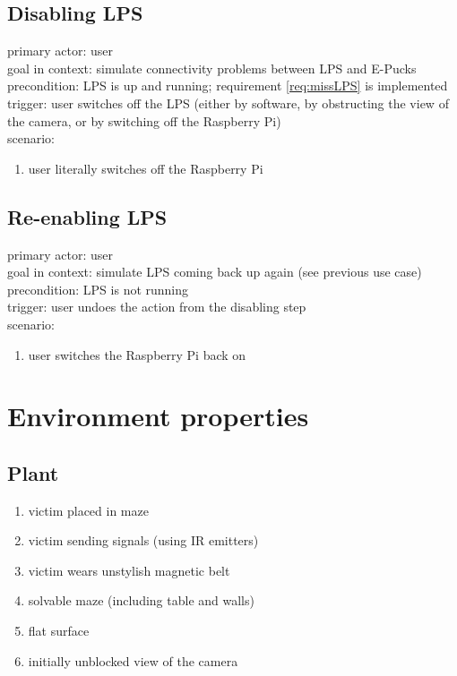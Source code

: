 \documentclass[a4paper,parskip,headheight=38pt]{scrartcl} %
\begin{document}
\subsection{Disabling LPS}
primary actor: user \\
goal in context: simulate connectivity problems between LPS and E-Pucks \\
precondition: LPS is up and running; requirement \ref{req:missLPS} is implemented \\
trigger: user switches off the LPS (either by software, by obstructing the view of the camera, or by switching off the Raspberry Pi) \\
scenario:
\begin{enumerate}[label={\arabic*.}]
	\item user literally switches off the Raspberry Pi
\end{enumerate}

\subsection{Re-enabling LPS}
primary actor: user \\
goal in context: simulate LPS coming back up again (see previous use case) \\
precondition: LPS is not running \\
trigger: user undoes the action from the disabling step \\
scenario:
\begin{enumerate}[label={\arabic*.}]
	\item user switches the Raspberry Pi back on
\end{enumerate}


\section{Environment properties}

\subsection{Plant}
\begin{enumerate}[label=\plant]
\item victim placed in maze
\item victim sending signals (using IR emitters)
\item victim wears unstylish magnetic belt
\item solvable maze (including table and walls)
\item flat surface
\item initially unblocked view of the camera
\end{enumerate}
\end{document}
